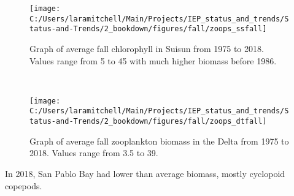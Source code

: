 \documentclass[
]{book}
\begin{document}
\begin{panel-grid}
\begin{columns-nocenter}
\begin{column40}
\end{column40}

\begin{column800}

\begin{expand}

\begin{figure}
\texttt{[image: C:/Users/laramitchell/Main/Projects/IEP\_status\_and\_trends/Status-and-Trends/2\_bookdown/figures/fall/zoops\_ssfall]} \caption{Graph of average fall chlorophyll in Suisun from 1975 to 2018. Values range from 5 to 45 with much higher biomass before 1986.}\label{fig:unnamed-chunk-116}
\end{figure}

\end{expand}

\end{column800}

\begin{column40}

~

\end{column40}

\begin{column800}

\begin{expand}

\begin{figure}
\texttt{[image: C:/Users/laramitchell/Main/Projects/IEP\_status\_and\_trends/Status-and-Trends/2\_bookdown/figures/fall/zoops\_dtfall]} \caption{Graph of average fall zooplankton biomass in the Delta from 1975 to 2018. Values range from 3.5 to 39.}\label{fig:unnamed-chunk-117}
\end{figure}

\end{expand}

\end{column800}

\end{columns-nocenter}

\begin{columns-nocenter}

\begin{column800}

In 2018, San Pablo Bay had lower than average biomass, mostly cyclopoid copepods.

\end{column800}

\begin{column40}


\end{column40}
\end{columns-nocenter}
\end{panel-grid}
\end{document}

